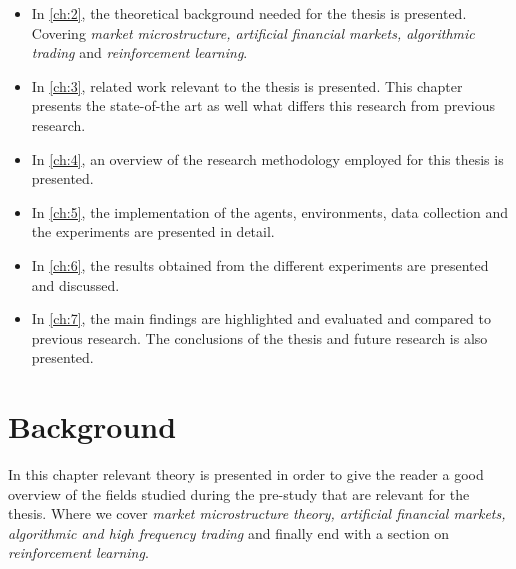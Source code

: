 \documentclass{kththesis}
\theoremstyle{definition}
\begin{document}
\begin{itemize}
    \item In \autoref{ch:2}, the theoretical background needed for the thesis is presented. Covering \textit{market microstructure, artificial financial markets, algorithmic trading} and \textit{reinforcement learning}.
    
    \item In \autoref{ch:3}, related work relevant to the thesis is presented. This chapter presents the state-of-the art as well what differs this research from previous research.
    
    \item In \autoref{ch:4}, an overview of the research methodology employed for this thesis is presented.
    
    \item In \autoref{ch:5}, the implementation of the agents, environments, data collection and the experiments are presented in detail.
    
    \item In \autoref{ch:6}, the results obtained from the different experiments are presented and discussed.
    
    \item In \autoref{ch:7}, the main findings are highlighted and evaluated and compared to previous research. The conclusions of the thesis and future research is also presented.
\end{itemize}

\chapter{Background}\label{ch:2}
In this chapter relevant theory is presented in order to give the reader a good overview of the fields studied during the pre-study that are relevant for the thesis. Where we cover \textit{market microstructure theory, artificial financial markets, algorithmic and high frequency trading} and finally end with a section on \textit{reinforcement learning}.


\end{document}
